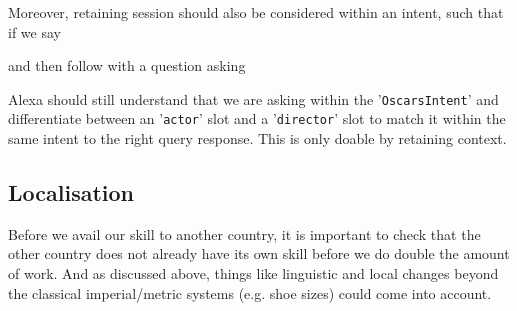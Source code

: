 Moreover, retaining session should also be considered within an intent, such that if we say


\begin{flushright}
\end{flushright}
\noindent and then follow with a question asking




\noindent Alexa should still understand that we are asking within the '\texttt{OscarsIntent}' and differentiate between an '\texttt{actor}' slot and a '\texttt{director}' slot to match it within the same intent to the right query response.
This is only doable by retaining context.


\subsection*{Localisation}
Before we avail our skill to another country, it is important to check that the other country does not already have its own skill before we do double the amount of work. And as discussed above, things like linguistic and local changes beyond the classical imperial/metric systems (e.g. shoe sizes) could come into account.

